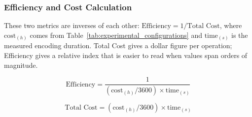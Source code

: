\documentclass[conference]{IEEEtran}
\begin{document}
\subsubsection{Efficiency and Cost Calculation}

These two metrics are inverses of each other: $\text{Efficiency} = 1/\text{Total Cost}$, where $\text{cost}_{(h)}$ comes from Table~\ref{tab:experimental_configurations} and $\text{time}_{(s)}$ is the measured encoding duration. Total Cost gives a dollar figure per operation; Efficiency gives a relative index that is easier to read when values span orders of magnitude.

\begin{equation}
	\text{Efficiency} = \frac{1}{(\text{cost}_{(h)}/3600) \times \text{time}_{(s)}}
	\label{eq:efficiency}
\end{equation}

\begin{equation}
	\text{Total Cost} = (\text{cost}_{(h)}/3600) \times \text{time}_{(s)}
	\label{eq:total_cost}
\end{equation}
\end{document}
